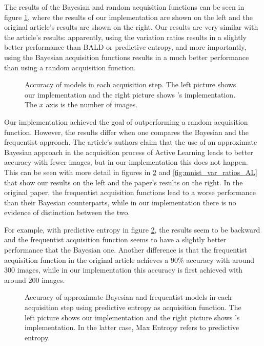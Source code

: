 The results of the Bayesian and random acquisition functions can be seen in figure \ref{fig:mnist_comparison_active_learning_random}, where the results of our implementation are shown on the left and the original article's results are shown on the right. Our results are very similar with the article's results: apparently, using the variation ratios results in a slightly better performance than BALD or predictive entropy, and more importantly, using the Bayesian acquisition functions results in a much better performance than using a random acquisition function.

\begin{figure}[H]
    \centering
    \hfill
    \caption{Accuracy of models in each acquisition step. The left picture shows our implementation and the right picture shows \citeauthor{Gal2016Active}'s implementation. The $x$ axis is the number of images.}
    \label{fig:mnist_comparison_active_learning_random}
\end{figure}

Our implementation achieved the goal of outperforming a random acquisition function. However, the results differ when one compares the Bayesian and the frequentist approach. The article's authors claim that the use of an approximate Bayesian approach in the acquisition process of Active Learning leads to better accuracy with fewer images, but in our implementation this does not happen. This can be seen with more detail in figures in \ref{fig:mnist_pred_entropy_AL} and \ref{fig:mnist_var_ratios_AL} that show our results on the left and the paper's results on the right. In the original paper, the frequentist acquisition functions lead to a worse performance than their Bayesian counterparts, while in our implementation there is no evidence of distinction between the two.

For example, with predictive entropy in figure \ref{fig:mnist_pred_entropy_AL}, the results seem to be backward and the frequentist acquisition function seems to have a slightly better performance that the Bayesian one. Another difference is that the frequentist acquisition function in the original article achieves a 90\% accuracy with around 300 images, while in our implementation this accuracy is first achieved with around 200 images.

\begin{figure}[H]
  \centering
  \hfill
  \caption{Accuracy of approximate Bayesian and frequentist models in each acquisition step using predictive entropy as acquisition function. The left picture shows our implementation and the right picture shows \citeauthor{Gal2016Active}'s implementation. In the latter case, Max Entropy refers to predictive entropy.}
  \label{fig:mnist_pred_entropy_AL}
\end{figure}

